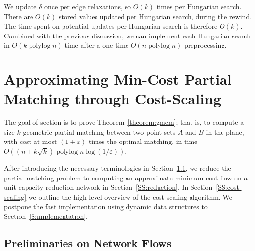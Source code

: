\documentclass[a4paper,UKenglish]{socg-lipics-v2018}
\def\polylog{\mathop{\mathrm{polylog}}}
\def\eps{\varepsilon}
\theoremstyle{plain}
\numberwithin{figure}{section}
\begin{document}
We update $\delta$ once per edge relaxations, so $O(k)$ times per Hungarian search.
There are $O(k)$ stored values updated per Hungarian search, during the rewind.
The time spent on potential updates per Hungarian search is therefore $O(k)$.
Combined with the previous discussion, we can implement each Hungarian search
in $O(k\polylog n)$ time after a one-time $O(n\polylog n)$ preprocessing.


\section{Approximating Min-Cost Partial Matching through Cost-Scaling}
\label{section:goldberg}

The goal of section is to prove Theorem~\ref{theorem:gmcm}; that is, to compute a size-$k$ geometric partial matching between two point sets $A$ and $B$ in the plane, with cost at most $(1+\eps)$ times the optimal matching, in time $O((n + k\sqrt{k})\polylog n \log(1/\eps))$.
%

After introducing the necessary terminologies in Section~\ref{SS:prelim-flow}, we reduce the partial matching problem to computing an approximate minimum-cost flow on a unit-capacity reduction network in Section~\ref{SS:reduction}.
In Section~\ref{SS:cost-scaling} we outline the high-level overview of the cost-scaling algorithm.
We postpone the fast implementation using dynamic data structures to Section~\ref{S:implementation}.

\subsection{Preliminaries on Network Flows}
\label{SS:prelim-flow}
\end{document}
